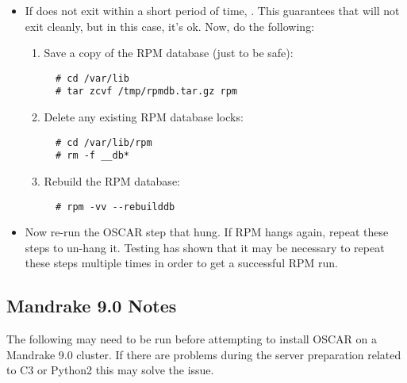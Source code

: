 \begin{itemize}
\begin{itemize}
        \item If  does not exit within a short period of
          time, .  This guarantees that
           will not exit cleanly, but in this case, it's ok.
          Now, do the following:
                        \begin{enumerate}
                        \item Save a copy of the RPM database (just to
                          be safe):
\begin{verbatim}
  # cd /var/lib
  # tar zcvf /tmp/rpmdb.tar.gz rpm
\end{verbatim}
                          
                        \item Delete any existing RPM database locks:
\begin{verbatim}
  # cd /var/lib/rpm
  # rm -f __db*
\end{verbatim}
                          
                        \item Rebuild the RPM database:
\begin{verbatim}
  # rpm -vv --rebuilddb
\end{verbatim}
                        \end{enumerate}
                        
                      \item Now re-run the OSCAR step that hung.  If
                        RPM hangs again, repeat these steps to un-hang
                        it.  Testing has shown that it may be
                        necessary to repeat these steps multiple times
                        in order to get a successful RPM run.
        \end{itemize}

\end{itemize}




\subsection{Mandrake 9.0 Notes}
\label{subsec:mdk90notes}

The following may need to be run before attempting to install OSCAR on a
Mandrake 9.0 cluster.  If there are problems during the server preparation
related to C3 or Python2 this may solve the issue.

